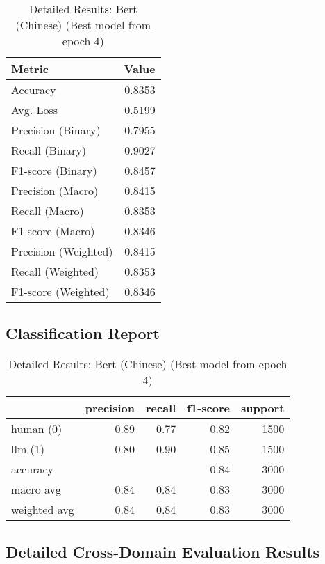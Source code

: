 \documentclass{article}
\begin{document}
\begin{table}[htbp]
\centering
\caption*{Detailed Results: Bert (Chinese) (Best model from epoch 4)}
\begin{tabular}{@{}lr@{}}
\toprule
Metric & Value \\
\midrule
Accuracy & 0.8353 \\
Avg. Loss & 0.5199 \\
Precision (Binary) & 0.7955 \\
Recall (Binary) & 0.9027 \\
F1-score (Binary) & 0.8457 \\
Precision (Macro) & 0.8415 \\
Recall (Macro) & 0.8353 \\
F1-score (Macro) & 0.8346 \\
Precision (Weighted) & 0.8415 \\
Recall (Weighted) & 0.8353 \\
F1-score (Weighted) & 0.8346 \\
\bottomrule
\end{tabular}
\subsection*{Classification Report}
\centering
\begin{tabular}{@{}lrrrr@{}}
\toprule
 & \textbf{precision} & \textbf{recall} & \textbf{f1-score} & \textbf{support} \\
\midrule
human (0) & 0.89 & 0.77 & 0.82 & 1500 \\
llm (1) & 0.80 & 0.90 & 0.85 & 1500 \\
\midrule
accuracy &  &  & 0.84 & 3000 \\
macro avg & 0.84 & 0.84 & 0.83 & 3000 \\
weighted avg & 0.84 & 0.84 & 0.83 & 3000 \\
\bottomrule
\end{tabular}
\end{table}
\clearpage
\subsection*{Detailed Cross-Domain Evaluation Results}

\end{document}
